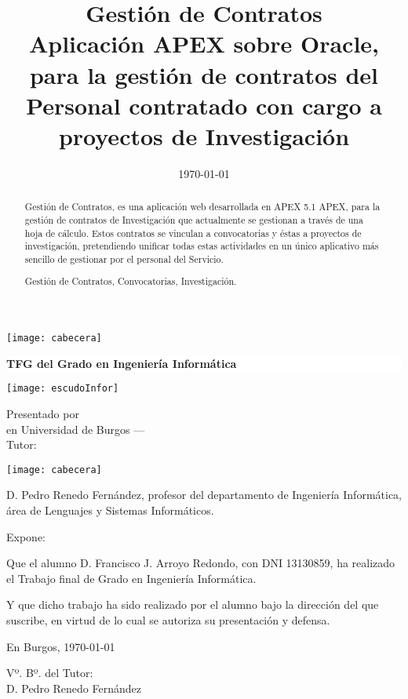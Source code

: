 \documentclass[a4paper,12pt,twoside]{memoir}
\title{\fontsize{18pt}{22pt}\selectfont Gestión de Contratos\\
	\fontsize{16pt}{18pt}\selectfont Aplicación APEX sobre Oracle, para la gestión de contratos del Personal contratado con cargo a proyectos de Investigación}
\author{\nombre}
\date{\today}
\makeatletter
\def\maketitle{
  \null
  \thispagestyle{empty}
\noindent\texttt{[image: cabecera]}\vspace{1cm}%
  \vfill
  
  \colorbox{white}{%
    \begin{minipage}{.8\textwidth}
      \vspace{.5cm}\Large
      \begin{center}
      \textbf{TFG del Grado en Ingeniería Informática}\vspace{.6cm}\\
      \textbf{\LARGE\@title{}}
      \end{center}
      \vspace{.2cm}
    \end{minipage}

  }%
  \hfill\begin{minipage}{.20\textwidth}
    \texttt{[image: escudoInfor]}
  \end{minipage}
  \vfill
  
  \begin{center}%
  {%
    \noindent\LARGE
    Presentado por \@author{}\\ 
    en Universidad de Burgos --- \@date{}\\
    Tutor: \@tutor{}\\
  }%
  \end{center}%
  \null
  \cleardoublepage
  }
\newcommand{\nombre}{Francisco J. Arroyo Redondo}
\makeatother
\begin{document}
\maketitle




\thispagestyle{empty}


\noindent\texttt{[image: cabecera]}\vspace{1cm}

\noindent D. Pedro Renedo Fernández, profesor del departamento de Ingeniería Informática, área de Lenguajes y Sistemas Informáticos.

\noindent Expone:

\noindent Que el alumno D. \nombre, con DNI 13130859, ha realizado el Trabajo final de Grado en Ingeniería Informática. 

\noindent Y que dicho trabajo ha sido realizado por el alumno bajo la dirección del que suscribe, en virtud de lo cual se autoriza su presentación y defensa.

\begin{center} %
En Burgos, {\large \today}
\end{center}

\vfill\vfill\vfill

\begin{center}
  Vº. Bº. del Tutor:\\[2cm]
  D. Pedro Renedo Fernández
  \end{center}


\newpage\null\thispagestyle{empty}\newpage




\frontmatter

\renewcommand*\abstractname{Resumen}
\begin{abstract}
Gestión de Contratos, es una aplicación web desarrollada en APEX 5.1 \acrfull{APEX}, para la gestión de contratos de Investigación que actualmente se gestionan a través de una hoja de cálculo. Estos contratos se vinculan a convocatorias y éstas a proyectos de investigación, pretendiendo unificar todas estas actividades en un único aplicativo más sencillo de gestionar por el personal del Servicio.

\end{abstract}

\renewcommand*\abstractname{Descriptores}
\begin{abstract}
Gestión de Contratos, Convocatorias, Investigación.
\end{abstract}
\end{document}
